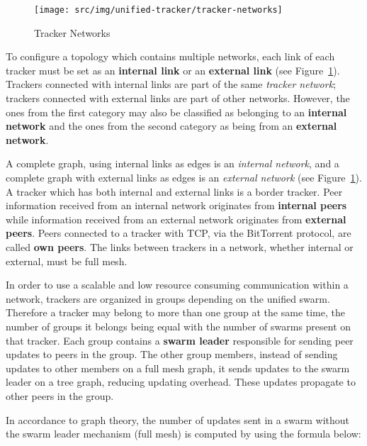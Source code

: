 \begin{figure}[h]
  \begin{center}
    \texttt{[image: src/img/unified-tracker/tracker-networks]}
  \end{center}
  \caption{Tracker Networks}
  \label{fig:unified-tracker:tracker-networks}
\end{figure}

To configure a topology which contains multiple networks, each link of each
tracker must be set as an \textbf{internal link} or an \textbf{external link}
(see Figure~\ref{fig:unified-tracker:tracker-networks}). Trackers connected
with internal links are part of the same \textit{tracker network}; trackers
connected with external links are part of other networks. However, the ones
from the first category may also be classified as belonging to an
\textbf{internal network} and the ones from the second category as being from
an \textbf{external network}.

A complete graph, using internal links as edges is an \textit{internal
network}, and a complete graph with external links as edges is an
\textit{external network} (see
Figure~\ref{fig:unified-tracker:tracker-networks}). A tracker which has both
internal and external links is a border tracker. Peer information received
from an internal network originates from \textbf{internal peers} while
information received from an external network originates from \textbf{external
peers}. Peers connected to a tracker with TCP, via the BitTorrent protocol,
are called \textbf{own peers}. The links between trackers in a network,
whether internal or external, must be full mesh.

In order to use a scalable and low resource consuming communication within a
network, trackers are organized in groups depending on the unified swarm.
Therefore a tracker may belong to more than one group at the same time, the
number of groups it belongs being equal with the number of swarms present on
that tracker. Each group contains a \textbf{swarm leader} responsible for
sending peer updates to peers in the group. The other group members, instead
of sending updates to other members on a full mesh graph, it sends updates to
the swarm leader on a tree graph, reducing updating overhead. These updates
propagate to other peers in the group.

In accordance to graph theory, the number of updates sent in a swarm without
the swarm leader mechanism (full mesh) is computed by using the formula below:


